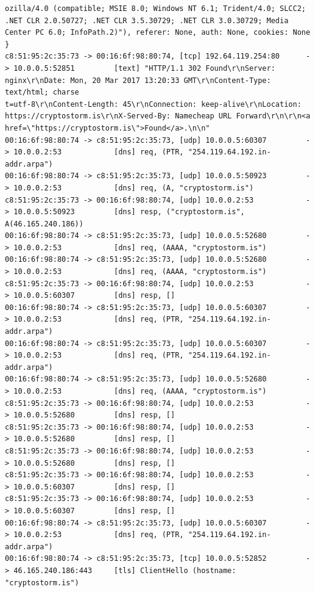 \documentclass[11pt]{diazessay} %
\begin{document}
\begin{lstlisting}
ozilla/4.0 (compatible; MSIE 8.0; Windows NT 6.1; Trident/4.0; SLCC2; .NET CLR 2.0.50727; .NET CLR 3.5.30729; .NET CLR 3.0.30729; Media Center PC 6.0; InfoPath.2)"), referer: None, auth: None, cookies: None }
c8:51:95:2c:35:73 -> 00:16:6f:98:80:74, [tcp] 192.64.119.254:80      -> 10.0.0.5:52851         [text] "HTTP/1.1 302 Found\r\nServer: nginx\r\nDate: Mon, 20 Mar 2017 13:20:33 GMT\r\nContent-Type: text/html; charse
t=utf-8\r\nContent-Length: 45\r\nConnection: keep-alive\r\nLocation: https://cryptostorm.is\r\nX-Served-By: Namecheap URL Forward\r\n\r\n<a href=\"https://cryptostorm.is\">Found</a>.\n\n"
00:16:6f:98:80:74 -> c8:51:95:2c:35:73, [udp] 10.0.0.5:60307         -> 10.0.0.2:53            [dns] req, (PTR, "254.119.64.192.in-addr.arpa")
00:16:6f:98:80:74 -> c8:51:95:2c:35:73, [udp] 10.0.0.5:50923         -> 10.0.0.2:53            [dns] req, (A, "cryptostorm.is")
c8:51:95:2c:35:73 -> 00:16:6f:98:80:74, [udp] 10.0.0.2:53            -> 10.0.0.5:50923         [dns] resp, ("cryptostorm.is", A(46.165.240.186))
00:16:6f:98:80:74 -> c8:51:95:2c:35:73, [udp] 10.0.0.5:52680         -> 10.0.0.2:53            [dns] req, (AAAA, "cryptostorm.is")
00:16:6f:98:80:74 -> c8:51:95:2c:35:73, [udp] 10.0.0.5:52680         -> 10.0.0.2:53            [dns] req, (AAAA, "cryptostorm.is")
c8:51:95:2c:35:73 -> 00:16:6f:98:80:74, [udp] 10.0.0.2:53            -> 10.0.0.5:60307         [dns] resp, []
00:16:6f:98:80:74 -> c8:51:95:2c:35:73, [udp] 10.0.0.5:60307         -> 10.0.0.2:53            [dns] req, (PTR, "254.119.64.192.in-addr.arpa")
00:16:6f:98:80:74 -> c8:51:95:2c:35:73, [udp] 10.0.0.5:60307         -> 10.0.0.2:53            [dns] req, (PTR, "254.119.64.192.in-addr.arpa")
00:16:6f:98:80:74 -> c8:51:95:2c:35:73, [udp] 10.0.0.5:52680         -> 10.0.0.2:53            [dns] req, (AAAA, "cryptostorm.is")
c8:51:95:2c:35:73 -> 00:16:6f:98:80:74, [udp] 10.0.0.2:53            -> 10.0.0.5:52680         [dns] resp, []
c8:51:95:2c:35:73 -> 00:16:6f:98:80:74, [udp] 10.0.0.2:53            -> 10.0.0.5:52680         [dns] resp, []
c8:51:95:2c:35:73 -> 00:16:6f:98:80:74, [udp] 10.0.0.2:53            -> 10.0.0.5:52680         [dns] resp, []
c8:51:95:2c:35:73 -> 00:16:6f:98:80:74, [udp] 10.0.0.2:53            -> 10.0.0.5:60307         [dns] resp, []
c8:51:95:2c:35:73 -> 00:16:6f:98:80:74, [udp] 10.0.0.2:53            -> 10.0.0.5:60307         [dns] resp, []
00:16:6f:98:80:74 -> c8:51:95:2c:35:73, [udp] 10.0.0.5:60307         -> 10.0.0.2:53            [dns] req, (PTR, "254.119.64.192.in-addr.arpa")
00:16:6f:98:80:74 -> c8:51:95:2c:35:73, [tcp] 10.0.0.5:52852         -> 46.165.240.186:443     [tls] ClientHello (hostname: "cryptostorm.is")

\end{lstlisting}
\end{document}
